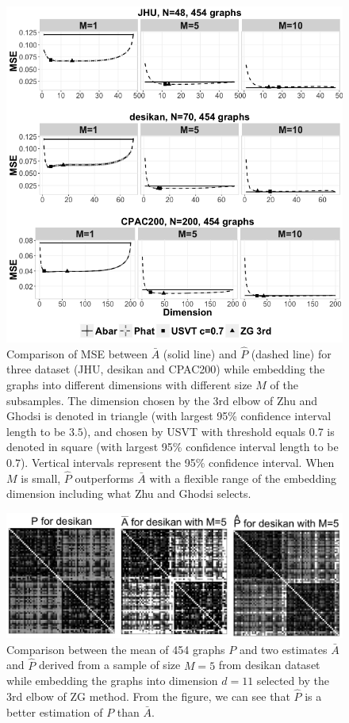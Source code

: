 \documentclass[a4paper]{article}
\begin{document}
\begin{figure}[!htb]
\centering
\includegraphics[width=1\textwidth]{realdata.png}
\caption{Comparison of MSE between $\bar{A}$ (solid line) and $\hat{P}$ (dashed line) for three dataset (JHU, desikan and CPAC200) while embedding the graphs into different dimensions with different size $M$ of the subsamples. The dimension chosen by the 3rd elbow of Zhu and Ghodsi is denoted in triangle (with largest 95\% confidence interval length to be $3.5$), and chosen by USVT with threshold equals 0.7 is denoted in square (with largest 95\% confidence interval length to be $0.7$).  Vertical intervals represent the 95\% confidence interval.  When $M$ is small, $\hat{P}$ outperforms $\bar{A}$ with a flexible range of the embedding dimension including what Zhu and Ghodsi selects.}
\label{fig:realdata}
\end{figure}




\begin{figure}[!htb]
\centering
\includegraphics[width=1\textwidth]{Matrix_desikan_m5.png}
\caption{Comparison between the mean of 454 graphs $P$ and two estimates $\bar{A}$ and $\hat{P}$ derived from a sample of size $M=5$ from desikan dataset while embedding the graphs into dimension $d=11$ selected by the 3rd elbow of ZG method. From the figure, we can see that $\hat{P}$ is a better estimation of $P$ than $\bar{A}$.}
\label{fig:Matrix_desikan_m5}
\end{figure}
\end{document}
